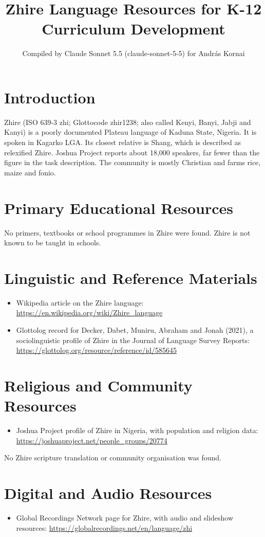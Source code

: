 \documentclass[12pt]{article}
\title{Zhire Language Resources for K-12 Curriculum Development}
\author{Compiled by Claude Sonnet 5.5 (claude-sonnet-5-5) for Andr\'as Kornai}
\date{}
\begin{document}
\maketitle

\section{Introduction}
Zhire (ISO 639-3 zhi; Glottocode zhir1238; also called Kenyi, Banyi, Jabji and Kanyi) is a poorly documented Plateau language of Kaduna State, Nigeria. It is spoken in Kagarko LGA. Its closest relative is Shang, which is described as relexified Zhire. Joshua Project reports about 18,000 speakers, far fewer than the figure in the task description. The community is mostly Christian and farms rice, maize and fonio.

\section{Primary Educational Resources}
No primers, textbooks or school programmes in Zhire were found. Zhire is not known to be taught in schools.

\section{Linguistic and Reference Materials}
\begin{itemize}
\item Wikipedia article on the Zhire language: \url{https://en.wikipedia.org/wiki/Zhire_language}
\item Glottolog record for Decker, Dabet, Muniru, Abraham and Jonah (2021), a sociolinguistic profile of Zhire in the Journal of Language Survey Reports: \url{https://glottolog.org/resource/reference/id/585645}
\end{itemize}

\section{Religious and Community Resources}
\begin{itemize}
\item Joshua Project profile of Zhire in Nigeria, with population and religion data: \url{https://joshuaproject.net/people_groups/20774}
\end{itemize}
No Zhire scripture translation or community organisation was found.

\section{Digital and Audio Resources}
\begin{itemize}
\item Global Recordings Network page for Zhire, with audio and slideshow resources: \url{https://globalrecordings.net/en/language/zhi}
\end{itemize}
\end{document}
